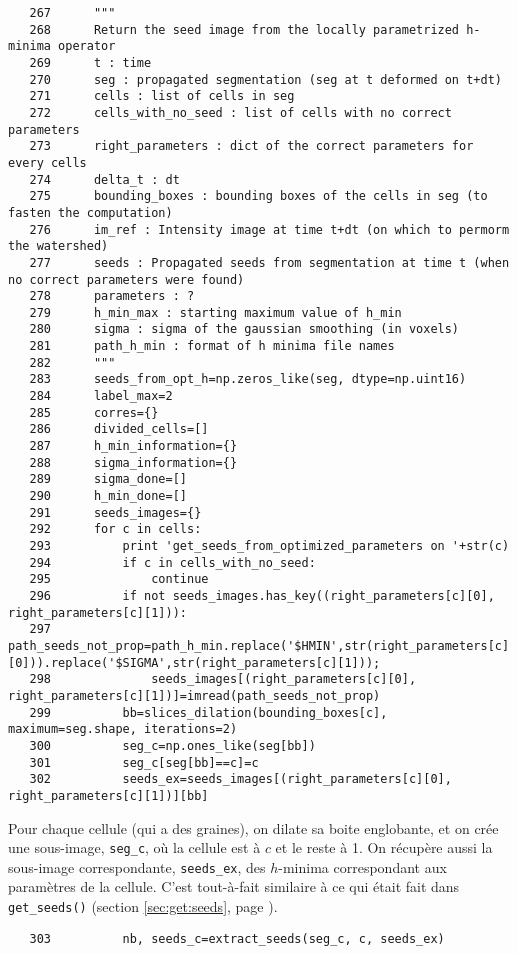 \documentclass{article}
\def \mycolor {red}
\begin{document}
\begin{verbatim}
   267	    """
   268	    Return the seed image from the locally parametrized h-minima operator
   269	    t : time
   270	    seg : propagated segmentation (seg at t deformed on t+dt)
   271	    cells : list of cells in seg
   272	    cells_with_no_seed : list of cells with no correct parameters
   273	    right_parameters : dict of the correct parameters for every cells
   274	    delta_t : dt
   275	    bounding_boxes : bounding boxes of the cells in seg (to fasten the computation)
   276	    im_ref : Intensity image at time t+dt (on which to permorm the watershed)
   277	    seeds : Propagated seeds from segmentation at time t (when no correct parameters were found)
   278	    parameters : ?
   279	    h_min_max : starting maximum value of h_min
   280	    sigma : sigma of the gaussian smoothing (in voxels)
   281	    path_h_min : format of h minima file names
   282	    """
   283	    seeds_from_opt_h=np.zeros_like(seg, dtype=np.uint16)
   284	    label_max=2
   285	    corres={}
   286	    divided_cells=[]
   287	    h_min_information={}
   288	    sigma_information={}
   289	    sigma_done=[]
   290	    h_min_done=[]
   291	    seeds_images={}
   292	    for c in cells:
   293	    	print 'get_seeds_from_optimized_parameters on '+str(c)
   294	        if c in cells_with_no_seed:
   295	            continue
   296	        if not seeds_images.has_key((right_parameters[c][0], right_parameters[c][1])):
   297	            path_seeds_not_prop=path_h_min.replace('$HMIN',str(right_parameters[c][0])).replace('$SIGMA',str(right_parameters[c][1]));
   298	            seeds_images[(right_parameters[c][0], right_parameters[c][1])]=imread(path_seeds_not_prop)
   299	        bb=slices_dilation(bounding_boxes[c], maximum=seg.shape, iterations=2)
   300	        seg_c=np.ones_like(seg[bb])
   301	        seg_c[seg[bb]==c]=c
   302	        seeds_ex=seeds_images[(right_parameters[c][0], right_parameters[c][1])][bb]
\end{verbatim} 
\color{\mycolor}
Pour chaque cellule (qui a des graines), on dilate sa boite englobante, et on cr\'ee une sous-image, \verb|seg_c|, o\`u la cellule est \`a $c$ et le reste \`a 1. On r\'ecup\`ere aussi la sous-image correspondante, \verb|seeds_ex|, des $h$-minima correspondant aux param\`etres de la cellule. C'est tout-\`a-fait similaire \`a ce qui \'etait fait dans \texttt{get\_seeds()} (section \ref {sec:get:seeds}, page \pageref{sec:get:seeds}).
\color{black}
\begin{verbatim}
   303	        nb, seeds_c=extract_seeds(seg_c, c, seeds_ex)
\end{verbatim} 
\end{document}
